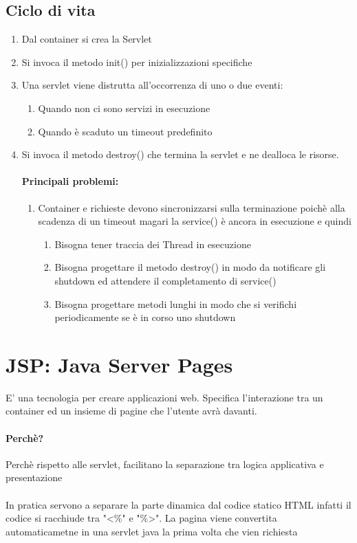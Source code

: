 \documentclass[12pt, a4paper, openany, twoside]{book}
\begin{document}
\subsection{Ciclo di vita}
\begin{enumerate}
	\item Dal container si crea la Servlet
	\item Si invoca il metodo init() per inizializzazioni specifiche
	\item Una servlet viene distrutta all'occorrenza di uno o due eventi:
	\begin{enumerate}
		\item Quando non ci sono servizi in esecuzione
		\item Quando è scaduto un timeout predefinito
	\end{enumerate}
	\item Si invoca il metodo destroy() che termina la servlet e ne dealloca
	le risorse.
	\paragraph{Principali problemi:}
	\begin{enumerate}
		\item Container e richieste devono sincronizzarsi sulla terminazione
		poichè alla scadenza di un timeout magari la service() è ancora in
		esecuzione e quindi
		\begin{enumerate}
			\item Bisogna tener traccia dei Thread in esecuzione
			\item Bisogna progettare il metodo destroy() in modo da notificare
			gli shutdown ed attendere il completamento di service()
			\item Bisogna progettare metodi lunghi in modo che si verifichi
			periodicamente se è in corso uno shutdown
		\end{enumerate}
	\end{enumerate}
\end{enumerate}
\section{JSP: Java Server Pages}
E' una tecnologia per creare applicazioni web.
Specifica l'interazione tra un container ed un insieme di pagine che l'utente
avrà davanti.
\paragraph{Perchè?} Perchè rispetto alle servlet, facilitano la separazione
tra logica applicativa e presentazione\\ \\
In pratica servono a separare la parte dinamica dal codice statico HTML
infatti il codice si racchiude tra "<\%" e "\%>". La pagina viene convertita
automaticametne in una servlet java la prima volta che vien richiesta
\end{document}
